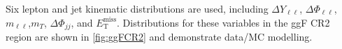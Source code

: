 Six lepton and jet kinematic distributions are used, including $\Delta Y_{\ell\ell}$, $\Delta \Phi_{\ell\ell}$,$m_{\ell\ell}$,$m_T$, $\Delta \Phi_{jj}$, and $\ensuremath{E_{\text{T}}^{\text{miss}}}$. Distributions for these variables in the ggF CR2 region are shown in \ref{fig:ggFCR2} and demonstrate data/MC modelling.
\begin{figure}[!h]
  \hfill
  \hfill
  \hfill
  \hfill

\end{figure}
